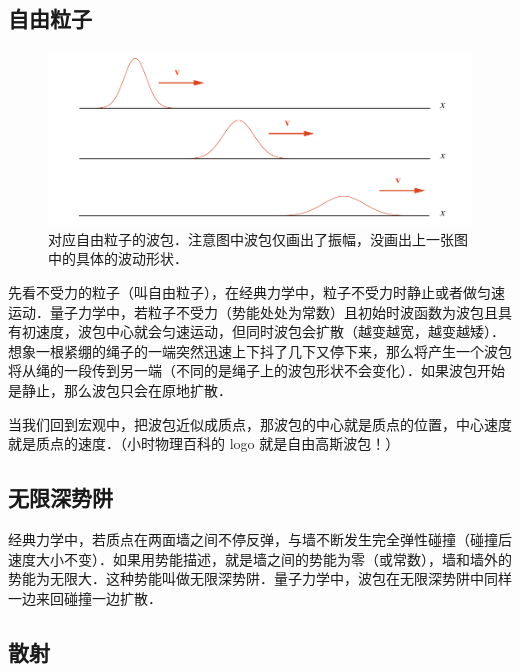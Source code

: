 \subsection{自由粒子}

\begin{figure}[ht]
\centering
\includegraphics[width=14cm]{./figures/QM02.pdf}
\caption{对应自由粒子的波包．注意图中波包仅画出了振幅，没画出上一张图中的具体的波动形状．} \label{QM0_fig2}
\end{figure}

先看不受力的粒子（叫自由粒子），在经典力学中，粒子不受力时静止或者做匀速运动．量子力学中，若粒子不受力（势能处处为常数）且初始时波函数为波包且具有初速度，波包中心就会匀速运动，但同时波包会扩散（越变越宽，越变越矮）．想象一根紧绷的绳子的一端突然迅速上下抖了几下又停下来，那么将产生一个波包将从绳的一段传到另一端（不同的是绳子上的波包形状不会变化）．如果波包开始是静止，那么波包只会在原地扩散．

当我们回到宏观中，把波包近似成质点，那波包的中心就是质点的位置，中心速度就是质点的速度．（小时物理百科的 logo 就是自由高斯波包！）

\subsection{无限深势阱}
经典力学中，若质点在两面墙之间不停反弹，与墙不断发生完全弹性碰撞（碰撞后速度大小不变）．如果用势能描述，就是墙之间的势能为零（或常数），墙和墙外的势能为无限大．这种势能叫做无限深势阱．量子力学中，波包在无限深势阱中同样一边来回碰撞一边扩散．

\subsection{散射}

